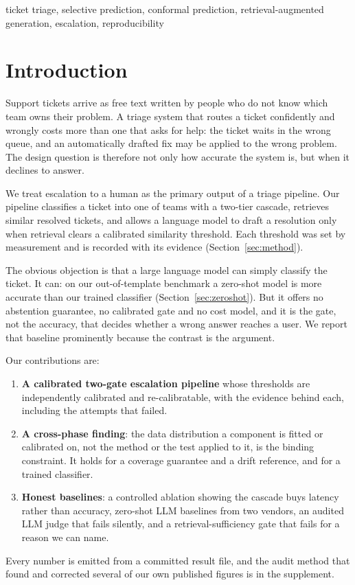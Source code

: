 \documentclass[conference,a4paper]{IEEEtran}
\begin{document}
\begin{IEEEkeywords}
ticket triage, selective prediction, conformal prediction, retrieval-augmented generation, escalation, reproducibility
\end{IEEEkeywords}

\section{Introduction}
Support tickets arrive as free text written by people who do not know which team owns their problem. A triage system that routes a ticket confidently and wrongly costs more than one that asks for help: the ticket waits in the wrong queue, and an automatically drafted fix may be applied to the wrong problem. The design question is therefore not only how accurate the system is, but when it declines to answer.

We treat escalation to a human as the primary output of a triage pipeline. Our pipeline classifies a ticket into one of  teams with a two-tier cascade, retrieves similar resolved tickets, and allows a language model to draft a resolution only when retrieval clears a calibrated similarity threshold. Each threshold was set by measurement and is recorded with its evidence (Section~\ref{sec:method}).

The obvious objection is that a large language model can simply classify the ticket. It can: on our out-of-template benchmark a zero-shot model is more accurate than our trained classifier (Section~\ref{sec:zeroshot}). But it offers no abstention guarantee, no calibrated gate and no cost model, and it is the gate, not the accuracy, that decides whether a wrong answer reaches a user. We report that baseline prominently because the contrast is the argument.

Our contributions are:
\begin{enumerate}
\item \textbf{A calibrated two-gate escalation pipeline} whose thresholds are independently calibrated and re-calibratable, with the evidence behind each, including the attempts that failed.
\item \textbf{A cross-phase finding}: the data distribution a component is fitted or calibrated on, not the method or the test applied to it, is the binding constraint. It holds for a coverage guarantee and a drift reference, and for a trained classifier.
\item \textbf{Honest baselines}: a controlled ablation showing the cascade buys latency rather than accuracy, zero-shot LLM baselines from two vendors, an audited LLM judge that fails silently, and a retrieval-sufficiency gate that fails for a reason we can name.
\end{enumerate}
Every number is emitted from a committed result file, and the audit method that found and corrected several of our own published figures is in the supplement.
\end{document}
